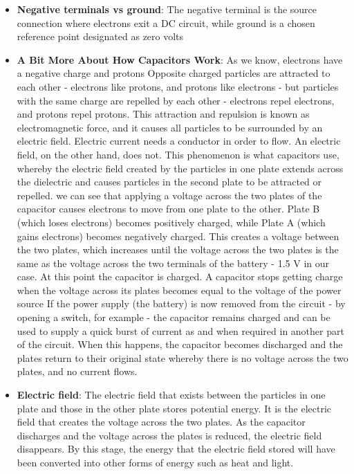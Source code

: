 \documentclass{report}
\begin{document}
\begin{itemize}
            \bigbreak \noindent 
            The negative terminal is the specific contact point on a battery or power supply where the voltage is lowest.
        \item \textbf{Negative terminals vs ground}: The negative terminal is the source connection where electrons exit a DC circuit, while ground is a chosen reference point designated as zero volts
        \item \textbf{A Bit More About How Capacitors Work}: As we know, electrons have a negative charge and protons
            \bigbreak \noindent 
            Opposite charged particles are attracted to each other - electrons like protons, and protons like electrons - but particles with the same charge are repelled by each other - electrons repel electrons, and protons repel protons. This attraction and repulsion is known as electromagnetic force, and it causes all particles to be surrounded by an electric field.
            \bigbreak \noindent 
            Electric current needs a conductor in order to flow. An electric field, on the other hand, does not. This phenomenon is what capacitors use, whereby the electric field created by the particles in one plate extends across the dielectric and causes particles in the second plate to be attracted or repelled.
            \bigbreak \noindent 
            \bigbreak \noindent 
            we can see that applying a voltage across the two plates of the capacitor causes electrons to move from one plate to the other. Plate B (which loses electrons) becomes positively charged, while Plate A (which gains electrons) becomes negatively charged. This creates a voltage between the two plates, which increases until the voltage across the two plates is the same as the voltage across the two terminals of the battery - 1.5 V in our case. At this point the capacitor is charged.
            \bigbreak \noindent 
            A capacitor stops getting charge when the voltage across its plates becomes equal to the voltage of the power source
            \bigbreak \noindent 
            If the power supply (the battery) is now removed from the circuit - by opening a switch, for example - the capacitor remains charged and can be used to supply a quick burst of current as and when required in another part of the circuit. When this happens, the capacitor becomes discharged and the plates return to their original state whereby there is no voltage across the two plates, and no current flows.
            \bigbreak \noindent 
        \item \textbf{Electric field}: The electric field that exists between the particles in one plate and those in the other plate stores potential energy. It is the electric field that creates the voltage across the two plates. As the capacitor discharges and the voltage across the plates is reduced, the electric field disappears. By this stage, the energy that the electric field stored will have been converted into other forms of energy such as heat and light.

\end{itemize}
\end{document}
